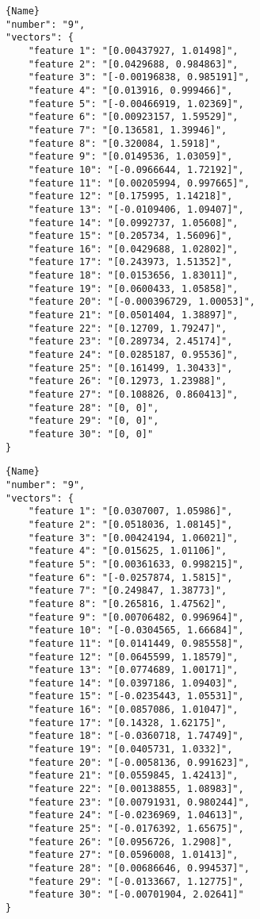 \noindent\begin{minipage}{.45\textwidth}
\begin{lstlisting}[caption={\code{calcOpticalFlowPyrLK} values},frame=tlrb,basicstyle=\tiny]{Name}
"number": "9",
"vectors": {
	"feature 1": "[0.00437927, 1.01498]",
	"feature 2": "[0.0429688, 0.984863]",
	"feature 3": "[-0.00196838, 0.985191]",
	"feature 4": "[0.013916, 0.999466]",
	"feature 5": "[-0.00466919, 1.02369]",
	"feature 6": "[0.00923157, 1.59529]",
	"feature 7": "[0.136581, 1.39946]",
	"feature 8": "[0.320084, 1.5918]",
	"feature 9": "[0.0149536, 1.03059]",
	"feature 10": "[-0.0966644, 1.72192]",
	"feature 11": "[0.00205994, 0.997665]",
	"feature 12": "[0.175995, 1.14218]",
	"feature 13": "[-0.0109406, 1.09407]",
	"feature 14": "[0.0992737, 1.05608]",
	"feature 15": "[0.205734, 1.56096]",
	"feature 16": "[0.0429688, 1.02802]",
	"feature 17": "[0.243973, 1.51352]",
	"feature 18": "[0.0153656, 1.83011]",
	"feature 19": "[0.0600433, 1.05858]",
	"feature 20": "[-0.000396729, 1.00053]",
	"feature 21": "[0.0501404, 1.38897]",
	"feature 22": "[0.12709, 1.79247]",
	"feature 23": "[0.289734, 2.45174]",
	"feature 24": "[0.0285187, 0.95536]",
	"feature 25": "[0.161499, 1.30433]",
	"feature 26": "[0.12973, 1.23988]",
	"feature 27": "[0.108826, 0.860413]",
	"feature 28": "[0, 0]",
	"feature 29": "[0, 0]",
	"feature 30": "[0, 0]"
}
\end{lstlisting}
\end{minipage}\hfill
\begin{minipage}{.45\textwidth}
	\begin{lstlisting}[caption={\code{compute\_lk\_gpu} values},frame=tlrb,basicstyle=\tiny]{Name}
"number": "9",
"vectors": {
	"feature 1": "[0.0307007, 1.05986]",
	"feature 2": "[0.0518036, 1.08145]",
	"feature 3": "[0.00424194, 1.06021]",
	"feature 4": "[0.015625, 1.01106]",
	"feature 5": "[0.00361633, 0.998215]",
	"feature 6": "[-0.0257874, 1.5815]",
	"feature 7": "[0.249847, 1.38773]",
	"feature 8": "[0.265816, 1.47562]",
	"feature 9": "[0.00706482, 0.996964]",
	"feature 10": "[-0.0304565, 1.66684]",
	"feature 11": "[0.0141449, 0.985558]",
	"feature 12": "[0.0645599, 1.18579]",
	"feature 13": "[0.0774689, 1.00171]",
	"feature 14": "[0.0397186, 1.09403]",
	"feature 15": "[-0.0235443, 1.05531]",
	"feature 16": "[0.0857086, 1.01047]",
	"feature 17": "[0.14328, 1.62175]",
	"feature 18": "[-0.0360718, 1.74749]",
	"feature 19": "[0.0405731, 1.0332]",
	"feature 20": "[-0.0058136, 0.991623]",
	"feature 21": "[0.0559845, 1.42413]",
	"feature 22": "[0.00138855, 1.08983]",
	"feature 23": "[0.00791931, 0.980244]",
	"feature 24": "[-0.0236969, 1.04613]",
	"feature 25": "[-0.0176392, 1.65675]",
	"feature 26": "[0.0956726, 1.2908]",
	"feature 27": "[0.0596008, 1.01413]",
	"feature 28": "[0.00686646, 0.994537]",
	"feature 29": "[-0.0133667, 1.12775]",
	"feature 30": "[-0.00701904, 2.02641]"
}
\end{lstlisting}
\end{minipage}


